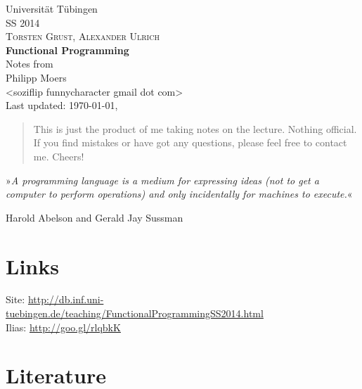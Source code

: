 \documentclass[12pt, oneside, a4paper, numbers=enddot, abstracton]{scrreprt}
\begin{document}
\begin{titlepage}
    \begin{center}
        \Large{Universität Tübingen}\\[1cm]
        \large{\scshape{SS 2014}}\\
        \large{\scshape{Torsten Grust, Alexander Ulrich}}\\[3cm]
        \Huge{\textbf{Functional Programming}}\\[6cm]
        \large{Notes from}\\[1cm]
        \large{Philipp Moers \\ <soziflip funnycharacter gmail dot com>}\\[3cm]
        \vfill
        \footnotesize{Last updated: \today, \currenttime}
    \end{center}
\end{titlepage}

\begin{abstract}
    This is just the product of me taking notes on the lecture. Nothing official. If you find mistakes or have got any questions, please feel free to contact me. Cheers!
\end{abstract}


\tableofcontents


\newpage

\vspace*{\fill}
»\textit{A programming language is a medium for expressing ideas (not to get a computer to perform operations) and only incidentally for machines to execute.}«\\
\begin{flushright}
    Harold Abelson and Gerald Jay Sussman
\end{flushright}
\vspace*{\fill}

\newpage


\section{Links}

Site: \url{http://db.inf.uni-tuebingen.de/teaching/FunctionalProgrammingSS2014.html}\\
Ilias: \url{http://goo.gl/rlqbkK}


\section{Literature}
\end{document}
